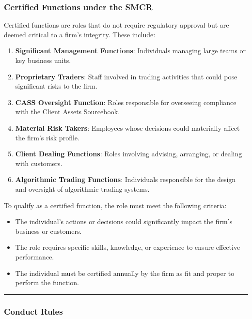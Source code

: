 \documentclass[
  a4paper,
]{article}
\providecommand{\tightlist}{%
  \setlength{\itemsep}{0pt}\setlength{\parskip}{0pt}}\usepackage{longtable,booktabs,array}
\begin{document}
\subsubsection{Certified Functions under the
SMCR}\label{certified-functions-under-the-smcr}

Certified functions are roles that do not require regulatory approval
but are deemed critical to a firm's integrity. These include:

\begin{enumerate}
\def\labelenumi{\arabic{enumi}.}
\tightlist
\item
  \textbf{Significant Management Functions}: Individuals managing large
  teams or key business units.
\item
  \textbf{Proprietary Traders}: Staff involved in trading activities
  that could pose significant risks to the firm.
\item
  \textbf{CASS Oversight Function}: Roles responsible for overseeing
  compliance with the Client Assets Sourcebook.
\item
  \textbf{Material Risk Takers}: Employees whose decisions could
  materially affect the firm's risk profile.
\item
  \textbf{Client Dealing Functions}: Roles involving advising,
  arranging, or dealing with customers.
\item
  \textbf{Algorithmic Trading Functions}: Individuals responsible for
  the design and oversight of algorithmic trading systems.
\end{enumerate}

To qualify as a certified function, the role must meet the following
criteria:

\begin{itemize}
\tightlist
\item
  The individual's actions or decisions could significantly impact the
  firm's business or customers.
\item
  The role requires specific skills, knowledge, or experience to ensure
  effective performance.
\item
  The individual must be certified annually by the firm as fit and
  proper to perform the function.
\end{itemize}

\begin{center}\rule{0.5\linewidth}{0.5pt}\end{center}

\subsubsection{Conduct Rules}\label{conduct-rules-1}
\end{document}
